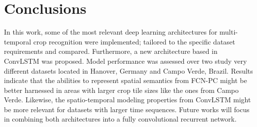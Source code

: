 
\section{Conclusions}

In this work, some of the most relevant deep learning architectures for multi-temporal crop recognition were implemented; tailored to the specific dataset requirements and compared. Furthermore, a new architecture based in ConvLSTM was proposed. Model performance was assessed over two study very different datasets located in Hanover, Germany and Campo Verde, Brazil. Results indicate that the abilities to represent spatial semantics from FCN-PC might be better harnessed in areas with larger crop tile sizes like the ones from Campo Verde. Likewise, the spatio-temporal modeling properties from ConvLSTM might be more relevant for datasets with larger time sequences. Future works will focus in combining both architectures into a fully convolutional recurrent network.
